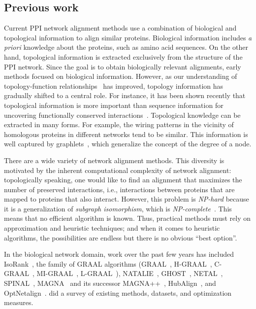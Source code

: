 \documentclass{bioinfo}
\begin{document}
\subsection{Previous work}\label{state}
Current PPI network alignment methods use a combination of biological and topological information to align similar proteins. Biological information includes \textit{a priori} knowledge about the proteins, such as amino acid sequences. On the other hand, topological information is extracted exclusively from the structure of the PPI network. Since the goal is to obtain biologically relevant alignments, early methods focused on biological information. However, as our understanding of topology-function
relationships~\citep{functionTopologyRelationship} has improved, topology information has gradually shifted to a central role. For instance, it has been shown recently that topological information is more important than sequence information for uncovering functionally conserved interactions~\citep{LGRAAL}.
Topological knowledge can be extracted in many forms. For example, the wiring patterns in the vicinity of homologous proteins in different networks tend to be similar. This information is well captured by graphlets~\citep{Przulj12122004}, which generalize the concept of the degree of a node.

There are a wide variety of network alignment methods. This diversity is motivated by the inherent computational complexity of network alignment: topologically speaking, one would like to find an alignment that maximizes the number of preserved interactions, i.e., interactions between proteins that are mapped to proteins that also interact. However, this problem is \textit{NP-hard} because it is a generalization of \textit{subgraph isomorphism}, which is \textit{NP-complete}~\citep{Cook:1971:CTP:800157.805047}. This means that no efficient algorithm is known. Thus, practical methods must rely on approximation and heuristic techniques; and when it comes to heuristic algorithms, the possibilities are endless but there is no obvious ``best option''.

In the biological network domain, work over the past few years has included IsoRank~\citep{Isorank}, the family of GRAAL algorithms (GRAAL~\citep{GRAAL}, H-GRAAL~\citep{HGRAAL}, C-GRAAL~\citep{CGRAAL}, MI-GRAAL~\citep{MIGRAAL}, L-GRAAL~\citep{LGRAAL}), NATALIE~\citep{NATALIE}, GHOST~\citep{GHOST}, NETAL~\citep{NETAL}, SPINAL~\citep{SPINAL}, MAGNA~\citep{MAGNA} and its successor MAGNA++~\citep{MAGNApp},  HubAlign~\citep{HubAlign}, and OptNetalign~\citep{optnetalign}. \cite{survey2015} did a survey of existing methods, datasets, and optimization measures.
\end{document}
